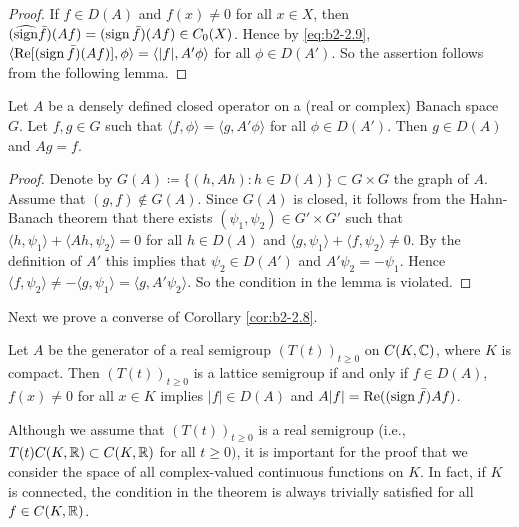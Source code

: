 \begin{proof}
If $f \in D(A)$ and $f(x) \neq 0$ for all $x \in X$, then $(\widehat{\operatorname{sign}} \bar{f})(Af) = (\operatorname{sign} \bar{f})(Af) \in C_{0}(X)$.
Hence by \eqref{eq:b2-2.9}, $\langle \mathop{}\!\mathrm{Re}[(\operatorname{sign} \bar{f})(Af)],\phi \rangle = \langle |f|,A'\phi \rangle$ for all $\phi \in D(A')$.
So the assertion follows from the following lemma.
\end{proof}

\begin{lemma}\label{lem:b2-2.9}
Let $A$ be a densely defined closed operator on a (real or complex) Banach space $G$.
Let $f, g \in G$ such that $\langle f,\phi \rangle = \langle g,A'\phi \rangle$ for all $\phi \in D(A')$.
Then $g \in D(A)$ and $Ag = f$.
\end{lemma}

\begin{proof}
Denote by $G(A) \coloneqq \{(h,Ah) : h \in D(A)\} \subset G \times G$ the graph of $A$.
Assume that $(g,f) \notin G(A)$.
Since $G(A)$ is closed, it follows from the Hahn-Banach theorem that there exists $(\psi_{1},\psi_{2}) \in G' \times G'$ such that $\langle h,\psi_{1} \rangle + \langle Ah,\psi_{2} \rangle = 0$ for all $h \in D(A)$ and $\langle g,\psi_{1} \rangle + \langle f,\psi_{2} \rangle \neq 0$.
By the definition of $A'$ this implies that $\psi_{2} \in D(A')$ and $A'\psi_{2} = -\psi_{1}$.
Hence $\langle f,\psi_{2} \rangle \neq -\langle g,\psi_{1} \rangle = \langle g,A'\psi_{2} \rangle$.
So the condition in the lemma is violated.
\end{proof}

Next we prove a converse of Corollary \ref{cor:b2-2.8}.

\begin{theorem}\label{thm:b2-2.10}
Let $A$ be the generator of a real semigroup $(T(t))_{t \geq 0}$ on $C(K,\mathbb{C})$, where $K$ is compact.
Then $(T(t))_{t \geq 0}$ is a lattice semigroup if and only if $f \in D(A)$, $f(x) \neq 0$ for all $x \in K$ implies $|f| \in D(A)$ and $A|f| = \mathop{}\!\mathrm{Re}((\operatorname{sign} \bar{f})Af)$.
\end{theorem}

\begin{remark*}\label{rem:b2-2.10-KGK}
Although we assume that $(T(t))_{t \geq 0}$ is a real semigroup (i.e.,\\ $T(t)C(K,\mathbb{R}) \subset C(K,\mathbb{R})$ for all $t \geq 0)$, it is important for the proof that we consider the space of all complex-valued continuous functions on $K$.
In fact, if $K$ is connected, the condition in the theorem is always trivially satisfied for all $f \in C(K,\mathbb{R})$.
\end{remark*}

